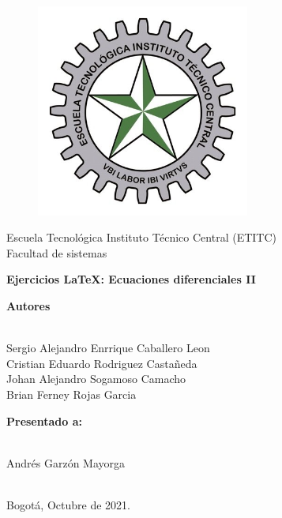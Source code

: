 \documentclass[a4paper,11pt, openany]{book}
\begin{document}
\begin{titlepage}
 
\begin{center}
\vspace*{-1in}
\begin{figure}[htb]
\begin{center}
\includegraphics[width=7cm]{ETITC.png}
\end{center}
\end{figure}
 
{\sc \huge Escuela Tecnológica Instituto Técnico Central (ETITC)}\\
\vspace*{0.15in}
Facultad de sistemas\\
\vspace*{0.6in}
\begin{Large}
\textbf{Ejercicios {\LaTeX}: Ecuaciones diferenciales II} \\
\end{Large}
\vspace*{0.3in}
\begin{large}
{\bf Autores} \\ 

\  

Sergio Alejandro Enrrique Caballero Leon\\ 
Cristian Eduardo Rodriguez Castañeda \\ 
Johan Alejandro Sogamoso Camacho \\ 
Brian Ferney Rojas Garcia

\end{large}
\vspace*{0.3in}
 
\end{center}
 
\begin{center}
{\bf Presentado a:} \\
 
\ 
 
Andrés Garzón Mayorga \\
 
\
 
Bogot{\'a}, Octubre de 2021.
\end{center}
 
\end{titlepage}
 
\end{document}
